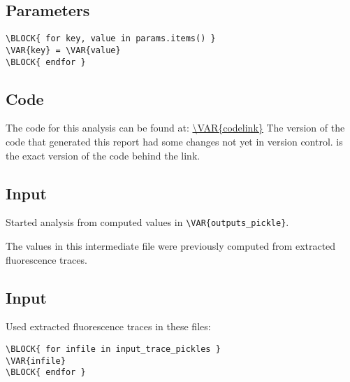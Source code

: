 \documentclass{article}
\begin{document}
\begin{flushleft}
\subsection{Parameters}
\begin{verbatim}
\BLOCK{ for key, value in params.items() }
\VAR{key} = \VAR{value}
\BLOCK{ endfor }
\end{verbatim}

\subsection{Code}
The code for this analysis can be found at:
\linebreak
\url{\VAR{codelink}}
\linebreak
The version of the code that generated this report  had some changes not yet in version control.   is the exact version of the code behind the link.


\subsection{Input}
Started analysis from computed values in \verb=\VAR{outputs_pickle}=.

The values in this intermediate file were previously computed from extracted
fluorescence traces.

\subsection{Input}
Used extracted fluorescence traces in these files:
\begin{verbatim}
\BLOCK{ for infile in input_trace_pickles }
\VAR{infile}
\BLOCK{ endfor }
\end{verbatim}

\pagebreak
{}

\end{flushleft}

\end{document}
